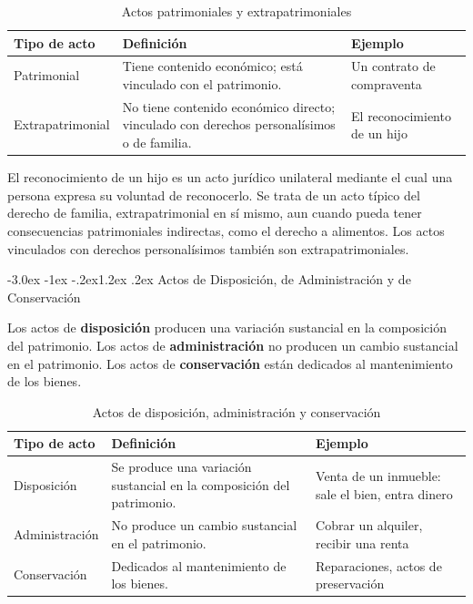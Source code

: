 \documentclass[12pt,oneside]{book}
\makeatletter
\renewcommand\section{\@startsection{section}{1}{\z@}%
  {-3.0ex \@plus -1ex \@minus -.2ex}{1.2ex \@plus .2ex}%
  {\normalfont\large\bfseries\color{acento}}}
\makeatother
\begin{document}
\begin{table}[H]
\centering
\begin{tabularx}{\textwidth}{l X X}
\toprule
\textbf{Tipo de acto} & \textbf{Definición} & \textbf{Ejemplo} \\
\midrule
Patrimonial & Tiene contenido económico; está vinculado con el patrimonio. & Un contrato de compraventa \\
Extrapatrimonial & No tiene contenido económico directo; vinculado con derechos personalísimos o de familia. & El reconocimiento de un hijo \\
\bottomrule
\end{tabularx}
\caption{Actos patrimoniales y extrapatrimoniales}
\end{table}

El reconocimiento de un hijo es un acto jurídico unilateral mediante el cual una persona expresa su voluntad de reconocerlo. Se trata de un acto típico del derecho de familia, extrapatrimonial en sí mismo, aun cuando pueda tener consecuencias patrimoniales indirectas, como el derecho a alimentos. Los actos vinculados con derechos personalísimos también son extrapatrimoniales.

\section{Actos de Disposición, de Administración y de Conservación}

\begin{definicion}
Los actos de \textbf{disposición} producen una variación sustancial en la composición del patrimonio. Los actos de \textbf{administración} no producen un cambio sustancial en el patrimonio. Los actos de \textbf{conservación} están dedicados al mantenimiento de los bienes.
\end{definicion}

\begin{table}[H]
\centering
\begin{tabularx}{\textwidth}{l X X}
\toprule
\textbf{Tipo de acto} & \textbf{Definición} & \textbf{Ejemplo} \\
\midrule
Disposición & Se produce una variación sustancial en la composición del patrimonio. & Venta de un inmueble: sale el bien, entra dinero \\
Administración & No produce un cambio sustancial en el patrimonio. & Cobrar un alquiler, recibir una renta \\
Conservación & Dedicados al mantenimiento de los bienes. & Reparaciones, actos de preservación \\
\bottomrule
\end{tabularx}
\caption{Actos de disposición, administración y conservación}
\end{table}
\end{document}
